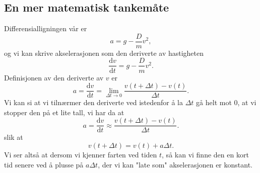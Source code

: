 \documentclass[a4paper, 11pt, notitlepage, english]{article}
\renewcommand{\d}{\text{d}}
\begin{document}
\subsection{En mer matematisk tankemåte}
Differensialligningen vår er
$$a = g - \frac{D}{m}v^2,$$
og vi kan skrive akselerasjonen som den deriverte av hastigheten
$$\frac{\d v}{\d t} = g - \frac{D}{m}v^2.$$
Definisjonen av den deriverte av $v$ er
$$a = \frac{\d v}{\d t} = \lim_{\Delta t \to 0} \frac{v(t+\Delta t)-v(t)}{\Delta t}.$$
Vi kan si at vi tilnærmer den deriverte ved istedenfor å la $\Delta t$ gå helt mot 0, at vi stopper den på et lite tall, vi har da at
$$a = \frac{\d v}{\d t} \approx \frac{v(t+\Delta t) - v(t)}{\Delta t}.$$
slik at
$$v(t+\Delta t) = v(t) + a\Delta t.$$
Vi ser altså at dersom vi kjenner farten ved tiden $t$, så kan vi finne den en kort tid senere ved å plusse på $a \Delta t$, der vi kan "late som" akselerasjonen er konstant.
\end{document}
